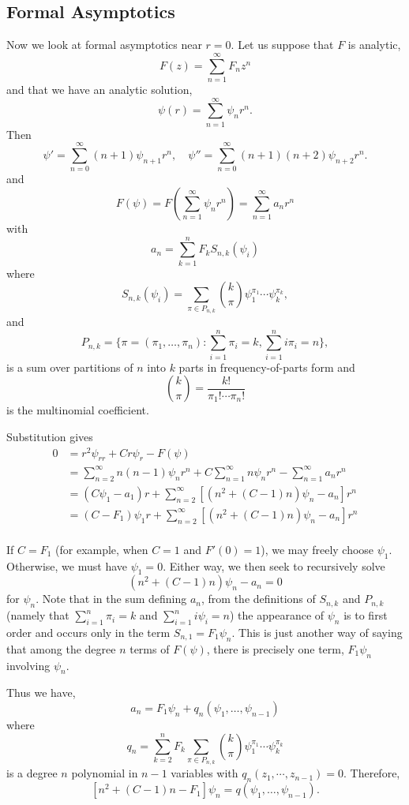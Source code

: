 \documentclass{amsart}
\begin{document}
\subsection{Formal Asymptotics}
\label{subsec:asymptotics}

Now we look at formal asymptotics near \(r = 0\). Let us suppose that \(F\) is analytic,
\[
F(z) = \sum_{n=1}^{\infty} F_n z^n
\]
and that we have an analytic solution,
\[
\psi(r) = \sum_{n=1}^{\infty} \psi_n r^n.
\]
Then
\[
\psi' = \sum_{n=0}^{\infty} (n+1) \psi_{n+1} r^n, \quad \psi'' = \sum_{n=0}^{\infty} (n+1)(n+2) \psi_{n+2} r^n.
\]
and
\[
F(\psi) = F(\sum_{n=1}^{\infty} \psi_n r^n) = \sum_{n=1}^{\infty} a_n r^n
\]
with
\[
a_n = \sum_{k=1}^n F_k S_{n,k}(\psi_i)
\]
where
\[
S_{n,k}(\psi_i) = \sum_{\pi \in P_{n,k}} {k \choose \pi} \psi_1^{\pi_1} \cdots \psi_k^{\pi_k},
\]
and
\[
P_{n,k} = \{\pi = (\pi_1, \dots, \pi_n) : \sum_{i=1}^n \pi_i = k, \sum_{i=1}^n i \pi_i = n\},
\]
is a sum over partitions of \(n\) into \(k\) parts in frequency-of-parts form and
\[
{k \choose \pi} = \frac{k!}{\pi_1! \cdots \pi_n!}
\]
is the multinomial coefficient.

Substitution gives
\[
\begin{split}
0&= r^2 \psi_{rr} + Cr\psi_r - F(\psi) \\
&= \sum_{n=2}^{\infty} n(n-1) \psi_n r^n + C \sum_{n=1}^{\infty} n \psi_n r^n - \sum_{n=1}^{\infty} a_n r^n \\
&= (C \psi_1 - a_1) r + \sum_{n=2}^{\infty} \left[(n^2 + (C-1)n)\psi_n - a_n\right] r^n \\
&= (C - F_1) \psi_1 r + \sum_{n=2}^{\infty} \left[(n^2 +(C-1)n)\psi_n - a_n\right] r^n \\
\end{split}
\]

If \(C = F_1\) (for example, when \(C = 1\) and \(F'(0) = 1\)), we may freely choose \(\psi_1\). Otherwise, we must have \(\psi_1 = 0\). Either way, we then seek to recursively solve
\[
(n^2 + (C-1)n)\psi_n - a_n = 0
\]
for \(\psi_n\). Note that in the sum defining \(a_n\), from the definitions of \(S_{n,k}\) and \(P_{n,k}\) (namely that \(\sum_{i=1}^n \pi_i = k\) and \(\sum_{i=1}^n i \psi_i = n\)) the appearance of \(\psi_n\) is to first order and occurs only in the term \(S_{n,1} = F_1 \psi_n\). This is just another way of saying that among the degree \(n\) terms of \(F(\psi)\), there is precisely one term, \(F_1 \psi_n\) involving \(\psi_n\).

Thus we have,
\[
a_n = F_1 \psi_n + q_n(\psi_1, \dots, \psi_{n-1})
\]
where
\[
q_n = \sum_{k=2}^n F_k \sum_{\pi \in P_{n,k}} {k \choose \pi} \psi_1^{\pi_1} \cdots \psi_k^{\pi_k}
\]
is a degree \(n\) polynomial in \(n-1\) variables with \(q_n(z_1, \cdots, z_{n-1}) = 0\). Therefore,
\[
\left[n^2 + (C-1) n - F_1\right] \psi_n =  q(\psi_1, \dots, \psi_{n-1}).
\]
\end{document}
